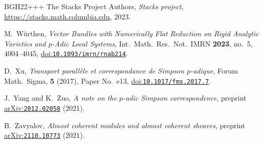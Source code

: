 \documentclass[10pt,a4paper]{article}
\newcommand{\doi}[1]{\href{https://doi.org/#1}{doi:\nolinkurl{#1}}}
\newcommand{\arXiv}[1]{\href{https://arxiv.org/abs/#1}{arXiv:\nolinkurl{#1}}}
\theoremstyle{definition}
\theoremstyle{remark}
\numberwithin{equation}{section}
\begin{document}
\begin{thebibliography}{BGH{\etalchar{+}}22+++}
The Stacks Project Authors, \emph{Stacks project}, \url{https://stacks.math.columbia.edu}, 2023. 
	
M.~W\"{u}rthen, 
{\em {V}ector {B}undles with {N}umerically {F}lat {R}eduction on {R}igid {A}nalytic {V}arieties and $p$-{A}dic {L}ocal {S}ystems}, Int.\ Math.\ Res.\ Not.\  IMRN \textbf{2023}, no.~5, 4004--4045, \doi{10.1093/imrn/rnab214}.
	
D.~Xu, 
{\em Transport parall\`ele et correspondance de {S}impson {$p$}-adique}, Forum Math.\ Sigma,  \textbf{5} (2017), Paper No.~e13, \doi{10.1017/fms.2017.7}.
	
J.~Yang and  K.~Zuo,
{\em A note on the $p$-adic {S}impson correspondence}, preprint \arXiv{2012.02058} (2021).
	
B.~Zavyalov, 
{\em Almost coherent modules and almost coherent sheaves}, preprint \arXiv{2110.10773} (2021).
	
\end{thebibliography}
\end{document}
